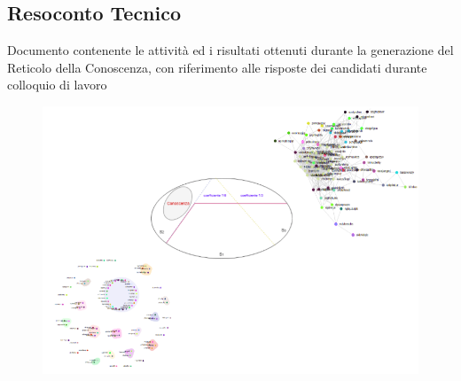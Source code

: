 \begin{center}\section*{Resoconto Tecnico}\end{center}
\begin{center}Documento contenente le attività ed i risultati ottenuti durante la generazione del Reticolo della Conoscenza, con riferimento alle risposte dei candidati durante colloquio di lavoro\end{center}
\vspace{2cm}
\begin{figure}[H]
\centering
	\includegraphics[width=1\linewidth]{./image/logo_Reticolo-della-Conoscenza.png}
\end{figure}